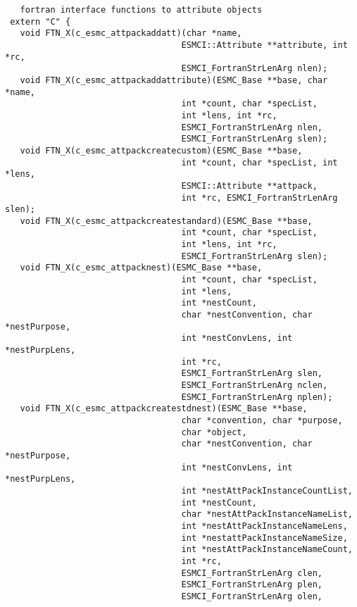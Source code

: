 \begin{verbatim}
   fortran interface functions to attribute objects
 extern "C" {
   void FTN_X(c_esmc_attpackaddatt)(char *name,
                                   ESMCI::Attribute **attribute, int *rc,
                                   ESMCI_FortranStrLenArg nlen);
   void FTN_X(c_esmc_attpackaddattribute)(ESMC_Base **base, char *name,
                                   int *count, char *specList,
                                   int *lens, int *rc,
                                   ESMCI_FortranStrLenArg nlen,
                                   ESMCI_FortranStrLenArg slen);
   void FTN_X(c_esmc_attpackcreatecustom)(ESMC_Base **base,
                                   int *count, char *specList, int *lens,
                                   ESMCI::Attribute **attpack,
                                   int *rc, ESMCI_FortranStrLenArg slen);
   void FTN_X(c_esmc_attpackcreatestandard)(ESMC_Base **base,
                                   int *count, char *specList,
                                   int *lens, int *rc,
                                   ESMCI_FortranStrLenArg slen);
   void FTN_X(c_esmc_attpacknest)(ESMC_Base **base,
                                   int *count, char *specList,
                                   int *lens,
                                   int *nestCount,
                                   char *nestConvention, char *nestPurpose,
                                   int *nestConvLens, int *nestPurpLens,
                                   int *rc,
                                   ESMCI_FortranStrLenArg slen,
                                   ESMCI_FortranStrLenArg nclen,
                                   ESMCI_FortranStrLenArg nplen);
   void FTN_X(c_esmc_attpackcreatestdnest)(ESMC_Base **base,
                                   char *convention, char *purpose,
                                   char *object,
                                   char *nestConvention, char *nestPurpose,
                                   int *nestConvLens, int *nestPurpLens,
                                   int *nestAttPackInstanceCountList,
                                   int *nestCount,
                                   char *nestAttPackInstanceNameList,
                                   int *nestAttPackInstanceNameLens,
                                   int *nestattPackInstanceNameSize,
                                   int *nestAttPackInstanceNameCount,
                                   int *rc,
                                   ESMCI_FortranStrLenArg clen,
                                   ESMCI_FortranStrLenArg plen,
                                   ESMCI_FortranStrLenArg olen,

\end{verbatim}
